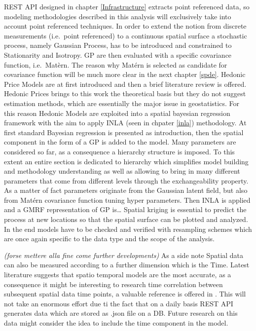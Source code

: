 \documentclass[
  12pt,
  a4paper,
  oneside]{book}
\theoremstyle{definition}
\theoremstyle{definition}
\theoremstyle{definition}
\theoremstyle{remark}
\begin{document}
REST API designed in chapter \ref{Infrastructure} extracts point referenced data, so modeling methodologies described in this analysis will exclusively take into account point referenced techniques.
In order to extend the notion from discrete measurements (i.e.~point referenced) to a continuous spatial surface a stochastic process, namely Gaussian Process, has to be introduced and constrained to Stationarity and Isotropy. GP are then evaluated with a specific covariance function, i.e.~Matèrn. The reason why Matérn is selected as candidate for covariance function will be much more clear in the next chapter \ref{spde}.
Hedonic Price Models are at first introduced and then a brief literature review is offered. Hedonic Prices brings to this work the theoretical basis but they do not suggest estimation methods, which are essentially the major issue in geostatistics. For this reason Hedonic Models are exploited into a spatial bayesian regression framework with the aim to apply INLA (seen in chpater \ref{inla}) methodology.
At first standard Bayesian regression is presented as introduction, then the spatial component in the form of a GP is added to the model. Many parameters are considered so far, as a consequence a hierarchy structure is imposed. To this extent an entire section is dedicated to hierarchy which simplifies model building and methodology understanding as well as allowing to bring in many different parameters that come from different levels through the exchangeability property.
As a matter of fact parameters originate from the Gaussian latent field, but also from Matérn covariance function tuning hyper parameters.
Then INLA is applied and a GMRF representation of GP is\ldots{}
Spatial kriging is essential to predict the process at new locations so that the spatial surface can be plotted and analyzed.
In the end models have to be checked and verified with resampling schemes which are once again specific to the data type and the scope of the analysis.

\emph{(forse mettere alla fine come further developments)}
As a side note Spatial data can also be measured according to a further dimension which is the Time. Latest literature suggests that spatio temporal models are the most accurate, as a consequence it might be interesting to research time correlation between subsequent spatial data time points, a valuable reference is offered in \citet{PACI2017149}. This will not take an enormous effort due ti the fact that on a daily basis REST API generates data which are stored as .json file on a DB. Future research on this data might consider the idea to include the time component in the model.
\end{document}
